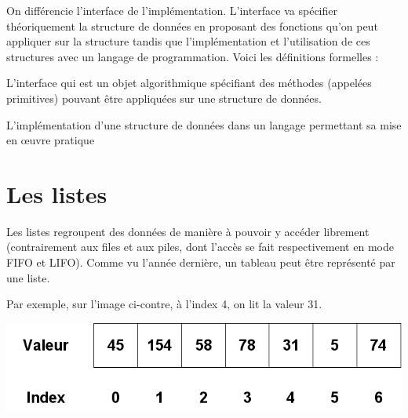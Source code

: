 \documentclass{report}
\begin{document}


On différencie l'interface de l'implémentation. L'interface va spécifier théoriquement la structure de données en proposant des fonctions qu'on peut appliquer sur la structure tandis que l'implémentation et l'utilisation de ces structures avec un langage de programmation. Voici les définitions formelles :

\begin{tcolorbox}[enhanced,
    colback=green!25!black!10!white,colframe=green!75!black,title=L'interface,
    drop fuzzy shadow,watermark color=white]
    L'interface qui est un objet algorithmique spécifiant des méthodes (appelées primitives) pouvant être appliquées sur une structure de données.
\end{tcolorbox}

\begin{tcolorbox}[enhanced,
    colback=green!25!black!10!white,colframe=green!75!black,title=L'implémentation,
    drop fuzzy shadow,watermark color=white]
    L'implémentation d'une structure de données dans un langage permettant sa mise en œuvre pratique
\end{tcolorbox}

\newpage
\section{Les listes}

Les listes regroupent des données de manière à pouvoir y accéder librement (contrairement aux files et aux piles, dont l'accès se fait respectivement en mode FIFO et LIFO). Comme vu l'année dernière, un tableau peut être représenté par une liste.\\

\begin{minipage}{0.45\linewidth}
    Par exemple, sur l'image ci-contre, à l'index 4, on lit la valeur 31. 
\end{minipage}\begin{minipage}{0.49\linewidth}
    \begin{center}
        \includegraphics*[width=\linewidth]{Tableau_une_dimension.png}
    \end{center}
\end{minipage}
\end{document}
